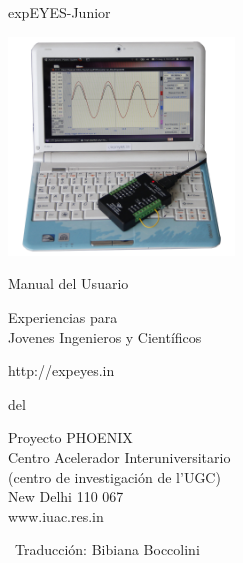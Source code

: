 \documentclass[12pt,a4paper]{report}
\begin{document}
\begin{titlepage}
\thispagestyle{empty}

\vspace{0.2in}

\begin{center}
{\Huge{}expEYES-Junior}
\par\end{center}{\Huge \par}

\begin{center}
\includegraphics[width=6cm]{../../pics/ej-with-pc-lr.jpg}
\par\end{center}

\begin{center}
{\large{}Manual del Usuario}
\par\end{center}{\large \par}

\begin{center}
{\LARGE{}Experiencias para}\\
{\LARGE{}Jovenes Ingenieros y Científicos}
\par\end{center}{\LARGE \par}

\begin{center}
http://expeyes.in
\par\end{center}

\begin{center}
del
\par\end{center}

\begin{center}
Proyecto PHOENIX\\
Centro Acelerador Interuniversitario \\
(centro de investigación de l'UGC)\\
New Delhi 110 067\\
www.iuac.res.in
\par\end{center}

\vfill

{~\hfill \small Traducción: Bibiana Boccolini}

\end{titlepage}
\end{document}
